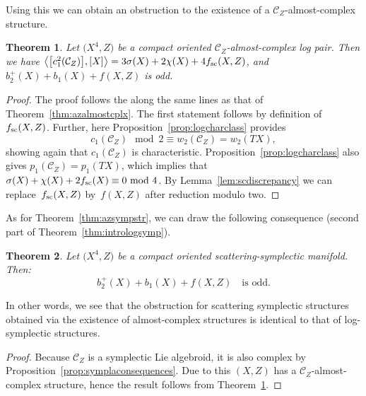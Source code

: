 \documentclass[10pt,a4paper]{amsart}
\numberwithin{equation}{section}
\newtheorem{Theorem}{Theorem}[section]
\begin{document}
Using this we can obtain an obstruction to the existence of a $\mathcal{C}_Z$-almost-complex structure.

\begin{Theorem}\label{thm:scatteringalmostcplx} Let $\big(X^4,Z\big)$ be a compact oriented $\mathcal{C}_Z$-almost-complex log pair. Then we have $\big\langle \big[c_1^2(\mathcal{C}_Z)\big], [X] \big\rangle = 3 \sigma(X) + 2 \chi(X) + 4 f_{\rm sc}(X,Z)$, and $b_2^+(X) + b_1(X) + f(X,Z)$ is odd.
\end{Theorem}

\begin{proof} The proof follows the along the same lines as that of Theorem~\ref{thm:azalmostcplx}. The first statement follows by definition of $f_{\rm sc}(X,Z)$. Further, here Proposition~\ref{prop:logcharclass} provides
\begin{displaymath}
	c_1(\mathcal{C}_Z) \!\!\mod 2 \equiv w_2(\mathcal{C}_Z) = w_2(TX),
\end{displaymath}
showing again that $c_1(\mathcal{C}_Z)$ is characteristic. Proposition~\ref{prop:logcharclass} also gives $p_1(\mathcal{C}_Z) = p_1(TX)$, which implies that $\sigma(X) + \chi(X) + 2 f_{\rm sc}(X) \equiv 0 \!\!\mod 4$. By Lemma~\ref{lem:scdiscrepancy} we can replace~$f_{\rm sc}(X,Z)$ by~$f(X,Z)$ after reduction modulo two.
\end{proof}

As for Theorem~\ref{thm:azsympstr}, we can draw the following consequence (second part of Theorem~\ref{thm:intrologsymp}).

\begin{Theorem}\label{thm:scatteringsymp} Let $\big(X^4,Z\big)$ be a compact oriented scattering-symplectic manifold. Then:
	\begin{displaymath}
		b_2^+(X) + b_1(X) + f(X,Z) \quad \text{is odd}.
	\end{displaymath}
\end{Theorem}

In other words, we see that the obstruction for scattering symplectic structures obtained via the existence of almost-complex structures is identical to that of log-symplectic structures.

\begin{proof} Because $\mathcal{C}_Z$ is a symplectic Lie algebroid, it is also complex by Proposition~\ref{prop:symplaconsequences}. Due to this $(X,Z)$ has a $\mathcal{C}_Z$-almost-complex structure, hence the result follows from Theorem~\ref{thm:scatteringalmostcplx}.
\end{proof}
\end{document}
